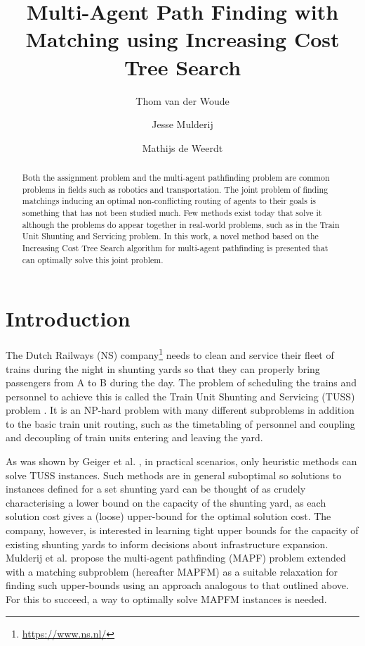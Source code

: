 \documentclass[english]{article}
\begin{document}
	
	\title{Multi-Agent Path Finding with Matching using Increasing Cost Tree Search}
	
	\author{Thom van der Woude\and Jesse Mulderij\and Mathijs de Weerdt}
	\date{}
	
	\maketitle
	
	\begin{abstract}
		Both the assignment problem and the multi-agent pathfinding problem are common problems in fields such as robotics and transportation. The joint problem of finding matchings inducing an optimal non-conflicting routing of agents to their goals is something that has not been studied much. Few methods exist today that solve it although the problems do appear together in real-world problems, such as in the Train Unit Shunting and Servicing problem. In this work, a novel method based on the Increasing Cost Tree Search algorithm for multi-agent pathfinding is presented that can optimally solve this joint problem.
	\end{abstract}
	
	\section{Introduction}
	The Dutch Railways (NS) company\footnote{\url{https://www.ns.nl/}} needs to clean and service their fleet of trains during the night in shunting yards so that they can properly bring passengers from A to B during the day. 
	The problem of scheduling the trains and personnel to achieve this is called the Train Unit Shunting and Servicing (TUSS) problem \cite{mulderij2020}. 
	It is an NP-hard problem with many different subproblems in addition to the basic train unit routing, such as the timetabling of personnel and coupling and decoupling of train units entering and leaving the yard. %
	
	As was shown by Geiger et al. \cite{geiger2018}, in practical scenarios, only heuristic methods can solve TUSS instances. 
	Such methods are in general suboptimal so solutions to instances defined for a set shunting yard can be thought of as crudely characterising a lower bound on the capacity of the shunting yard, as each solution cost gives a (loose) upper-bound for the optimal solution cost. 
	The company, however, is interested in learning tight upper bounds for the capacity of existing shunting yards to inform decisions about infrastructure expansion. 
	Mulderij et al. \cite{mulderij2020} propose the multi-agent pathfinding (MAPF) problem \cite{stern2019} extended with a matching subproblem (hereafter MAPFM) as a suitable relaxation for finding such upper-bounds using an approach analogous to that outlined above.
	For this to succeed, a way to optimally solve MAPFM instances is needed.
\end{document}
